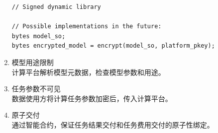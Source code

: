 \begin{enumerate}
\begin{lstlisting}
// Signed dynamic library

// Possible implementations in the future: 
bytes model_so; 
bytes encrypted_model = encrypt(model_so, platform_pkey); 
\end{lstlisting}

    \item 模型用途限制\\ 
    计算平台解析模型元数据，检查模型参数和用途。
    \item 任务参数不可见\\ 
    数据使用方将计算任务参数加密后，传入计算平台。
    \item 原子交付\\
    通过智能合约，保证任务结果交付和任务费用交付的原子性绑定。
\end{enumerate}

